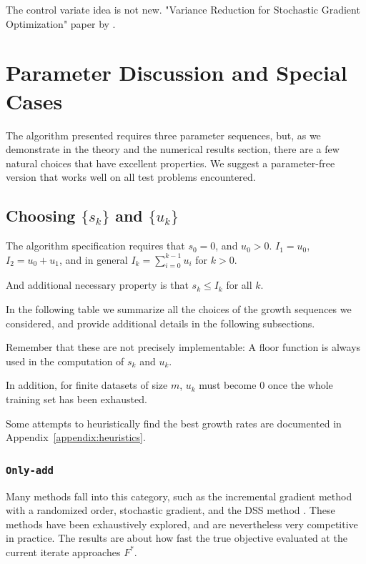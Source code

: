 \documentclass[11pt]{article}
\begin{document}
The control variate idea is not new. "Variance Reduction for
Stochastic Gradient Optimization" paper by \cite{wang2013variance}.



\section{Parameter Discussion and Special Cases}

The algorithm presented requires three parameter sequences, but, as we demonstrate in the theory and the numerical results section, there are a few natural choices that have excellent properties. We suggest a parameter-free version that works well on all test problems encountered. 


\subsection{Choosing $\{s_k\}$ and $\{u_k\}$}

The algorithm specification requires that $s_0=0$, and $u_0>0$. $I_1 = u_0$, $I_2= u_0+u_1$, and in general $I_k = \sum_{i=0}^{k-1} u_i$ for $k>0$.

And additional necessary property is that $s_k \leq I_k$ for all $k$. 

In the following table we summarize all the choices of the growth sequences we considered, and provide additional details in the following subsections. 

Remember that these are not precisely implementable: A floor function is always used in the computation of $s_k$ and $u_k$.

In addition, for finite datasets of size $m$, $u_k$ must become $0$ once the whole training set has been exhausted. 

Some attempts to heuristically find the best growth rates are documented in Appendix~\ref{appendix:heuristics}.

\subsubsection{\texttt{Only-add}}

Many methods fall into this category, such as the incremental gradient method with a randomized order, stochastic gradient, and the DSS method \cite{dss}. These methods have been exhaustively explored, and are nevertheless very competitive in practice. The results are about how fast the true objective evaluated at the current iterate approaches $F^*$.
\end{document}
